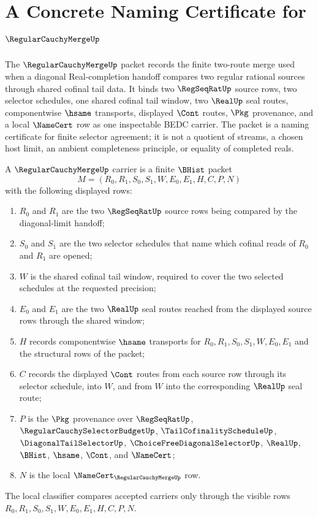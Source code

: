\chapter{A Concrete Naming Certificate for $\RegularCauchyMergeUp$}
\label{ch:concrete-instances-regularcauchymerge-namecert}

The $\RegularCauchyMergeUp$ packet records the finite two-route merge used when a diagonal Real-completion handoff compares two regular rational sources through shared cofinal tail data. It binds two $\RegSeqRatUp$ source rows, two selector schedules, one shared cofinal tail window, two $\RealUp$ seal routes, componentwise $\hsame$ transports, displayed $\Cont$ routes, $\Pkg$ provenance, and a local $\NameCert$ row as one inspectable BEDC carrier. The packet is a naming certificate for finite selector agreement; it is not a quotient of streams, a chosen host limit, an ambient completeness principle, or equality of completed reals.

\begin{definition}
\label{def:regular-cauchy-merge-carrier}
A $\RegularCauchyMergeUp$ carrier is a finite $\BHist$ packet
$$
M=(R_0,R_1,S_0,S_1,W,E_0,E_1,H,C,P,N)
$$
with the following displayed rows:
\begin{enumerate}
\item $R_0$ and $R_1$ are the two $\RegSeqRatUp$ source rows being compared by the diagonal-limit handoff;
\item $S_0$ and $S_1$ are the two selector schedules that name which cofinal reads of $R_0$ and $R_1$ are opened;
\item $W$ is the shared cofinal tail window, required to cover the two selected schedules at the requested precision;
\item $E_0$ and $E_1$ are the two $\RealUp$ seal routes reached from the displayed source rows through the shared window;
\item $H$ records componentwise $\hsame$ transports for $R_0,R_1,S_0,S_1,W,E_0,E_1$ and the structural rows of the packet;
\item $C$ records the displayed $\Cont$ routes from each source row through its selector schedule, into $W$, and from $W$ into the corresponding $\RealUp$ seal route;
\item $P$ is the $\Pkg$ provenance over $\RegSeqRatUp$, $\RegularCauchySelectorBudgetUp$, $\TailCofinalityScheduleUp$, $\DiagonalTailSelectorUp$, $\ChoiceFreeDiagonalSelectorUp$, $\RealUp$, $\BHist$, $\hsame$, $\Cont$, and $\NameCert$;
\item $N$ is the local $\NameCert_{\RegularCauchyMergeUp}$ row.
\end{enumerate}
The local classifier compares accepted carriers only through the visible rows $R_0,R_1,S_0,S_1,W,E_0,E_1,H,C,P,N$.
\end{definition}


